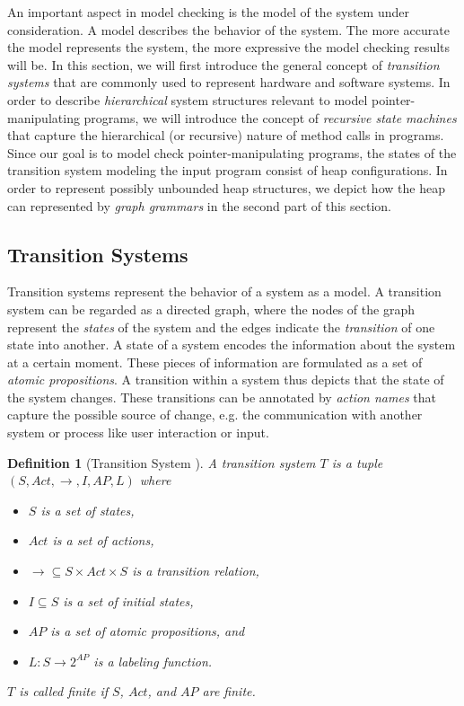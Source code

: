 \documentclass[a4paper, 12pt, twoside]{report}
\theoremstyle{plain}
\newtheorem{definition}[theorem]{Definition}
\begin{document}
	An important aspect in model checking is the model of the system under consideration. A model describes the behavior of the system. The more accurate the model represents the system, the more expressive the model checking results will be. In this section, we will first introduce the general concept of \textit{transition systems} that are commonly used to represent hardware and software systems. In order to describe \textit{hierarchical} system structures relevant to model pointer-manipulating programs, we will introduce the concept of \textit{recursive state machines} that capture the hierarchical (or recursive) nature of method calls in programs. \\
	
	Since our goal is to model check pointer-manipulating programs, the states of the transition system modeling the input program consist of heap configurations. In order to represent possibly unbounded heap structures, we depict how the heap can represented by \textit{graph grammars} in the second part of this section.
	
	\subsection{Transition Systems}
	
	Transition systems represent the behavior of a system as a model. A transition system can be regarded as a directed graph, where the nodes of the graph represent the \textit{states} of the system and the edges indicate the \textit{transition} of one state into another. A state of a system encodes the information about the system at a certain moment. These pieces of information are formulated as a set of \textit{atomic propositions}. A transition within a system thus depicts that the state of the system changes. These transitions can be annotated by \textit{action names} that capture the possible source of change, e.g. the communication with another system or process like user interaction or input. 
	
	\begin{definition}[Transition System \cite{baier2008principles}]\label{def:transition system}
		A \textup{transition system} $T$ is a tuple $(S, Act, \rightarrow, I, AP, L)$ where
		\begin{itemize}
			\item $S$ is a set of states,
			\item $Act$ is a set of actions,
			\item $\rightarrow \subseteq S \times Act \times S$ is a transition relation,
			\item $I \subseteq S$ is a set of initial states,
			\item $AP$ is a set of atomic propositions, and
			\item $L: S \rightarrow 2^{AP}$ is a labeling function.
		\end{itemize}
		$T$ is called \textup{finite} if $S$, $Act$, and $AP$ are finite.
	\end{definition}
\end{document}
